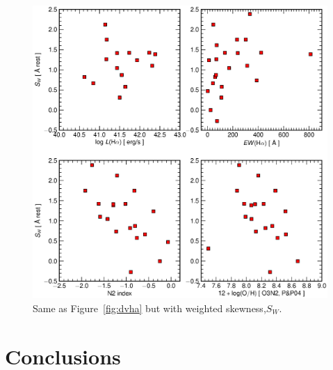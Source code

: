 \documentclass[manuscript]{emulateapj}
\begin{document}
\begin{figure}[t!]
   \centering
   \includegraphics[scale=.4]{swr_ha.eps}
   \caption{ Same as Figure~\ref{fig:dvha} but with weighted skewness,$S_W$. }
   \label{fig:asymha}
\end{figure}








\section{Conclusions}
\end{document}
